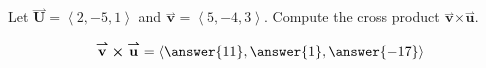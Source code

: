 \documentclass{ximera}
\author{Gregory Hartman \and Matthew Carr}
\begin{document}
\begin{exercise}
Let $\overset{\boldsymbol{\rightharpoonup}}{\mathbf{U}} = \left< 2,-5,1 \right>$ and $\overset{\boldsymbol{\rightharpoonup}}{\mathbf{v}} = \left< 5,-4,3 \right>$. Compute the cross product $\overset{\boldsymbol{\rightharpoonup}}{\mathbf{v}} \boldsymbol\times \overset{\boldsymbol{\rightharpoonup}}{\mathbf{u}}$.

\begin{prompt}
\[
\overset{\boldsymbol{\rightharpoonup}}{\mathbf{v}} \boldsymbol\times \overset{\boldsymbol{\rightharpoonup}}{\mathbf{u}} = \left< \answer{11},\answer{1},\answer{-17} \right>
\]
\end{prompt}


\end{exercise}
\end{document}
